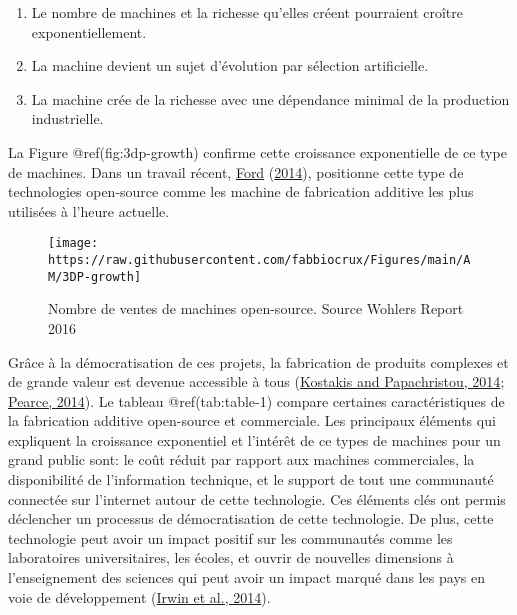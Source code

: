 \documentclass[
]{article}
\providecommand{\tightlist}{%
  \setlength{\itemsep}{0pt}\setlength{\parskip}{0pt}}
\begin{document}
\begin{enumerate}
\def\labelenumi{\arabic{enumi}.}
\tightlist
\item
  Le nombre de machines et la richesse qu'elles créent pourraient
  croître exponentiellement.
\item
  La machine devient un sujet d'évolution par sélection artificielle.
\item
  La machine crée de la richesse avec une dépendance minimal de la
  production industrielle.
\end{enumerate}

La Figure @ref(fig:3dp-growth) confirme cette croissance exponentielle
de ce type de machines. Dans un travail récent,
\protect\hyperlink{ref-Ford2014}{Ford}
(\protect\hyperlink{ref-Ford2014}{2014}), positionne cette type de
technologies open-source comme les machine de fabrication additive les
plus utilisées à l'heure actuelle.

\begin{figure}

{\centering \texttt{[image: https://raw.githubusercontent.com/fabbiocrux/Figures/main/AM/3DP-growth]} 

}

\caption{Nombre de ventes de machines open-source. Source Wohlers Report 2016}\label{fig:3dp-growth}
\end{figure}

Grâce à la démocratisation de ces projets, la fabrication de produits
complexes et de grande valeur est devenue accessible à tous
(\protect\hyperlink{ref-Kostakis2013}{Kostakis and Papachristou, 2014};
\protect\hyperlink{ref-Pearce2014k}{Pearce, 2014}). Le tableau
@ref(tab:table-1) compare certaines caractéristiques de la fabrication
additive open-source et commerciale. Les principaux éléments qui
expliquent la croissance exponentiel et l'intérêt de ce types de
machines pour un grand public sont: le coût réduit par rapport aux
machines commerciales, la disponibilité de l'information technique, et
le support de tout une communauté connectée sur l'internet autour de
cette technologie. Ces éléments clés ont permis déclencher un processus
de démocratisation de cette technologie. De plus, cette technologie peut
avoir un impact positif sur les communautés comme les laboratoires
universitaires, les écoles, et ouvrir de nouvelles dimensions à
l'enseignement des sciences qui peut avoir un impact marqué dans les
pays en voie de développement (\protect\hyperlink{ref-Irwin2014}{Irwin
et al., 2014}).
\end{document}
